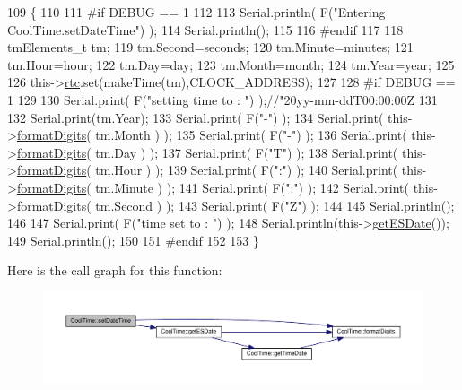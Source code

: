 \begin{DoxyCode}
109 \{ 
110 
111 \textcolor{preprocessor}{#if DEBUG == 1}
112 
113     Serial.println( F(\textcolor{stringliteral}{"Entering CoolTime.setDateTime"}) );
114     Serial.println();
115 
116 \textcolor{preprocessor}{#endif}
117 
118     tmElements\_t tm;
119     tm.Second=seconds; 
120     tm.Minute=minutes; 
121     tm.Hour=hour; 
122     tm.Day=day;
123     tm.Month=month; 
124     tm.Year=year;
125     
126     this->\hyperlink{class_cool_time_abd38f2384ff90692b1568d9db869412e}{rtc}.set(makeTime(tm),CLOCK\_ADDRESS);   
127 
128 \textcolor{preprocessor}{#if DEBUG == 1}
129 
130     Serial.print( F(\textcolor{stringliteral}{"setting time to : "}) );\textcolor{comment}{//"20yy-mm-ddT00:00:00Z}
131 
132     Serial.print(tm.Year);
133     Serial.print( F(\textcolor{stringliteral}{"-"}) );
134     Serial.print( this->\hyperlink{class_cool_time_acd537cd4210d7bde4e1f5c47d2ac0456}{formatDigits}( tm.Month ) );
135     Serial.print( F(\textcolor{stringliteral}{"-"}) );
136     Serial.print( this->\hyperlink{class_cool_time_acd537cd4210d7bde4e1f5c47d2ac0456}{formatDigits}( tm.Day ) );
137     Serial.print( F(\textcolor{stringliteral}{"T"}) );
138     Serial.print( this->\hyperlink{class_cool_time_acd537cd4210d7bde4e1f5c47d2ac0456}{formatDigits}( tm.Hour ) );
139     Serial.print( F(\textcolor{stringliteral}{":"}) );
140     Serial.print( this->\hyperlink{class_cool_time_acd537cd4210d7bde4e1f5c47d2ac0456}{formatDigits}( tm.Minute ) );
141     Serial.print( F(\textcolor{stringliteral}{":"}) );
142     Serial.print( this->\hyperlink{class_cool_time_acd537cd4210d7bde4e1f5c47d2ac0456}{formatDigits}( tm.Second ) );
143     Serial.print( F(\textcolor{stringliteral}{"Z"}) );
144 
145     Serial.println();
146     
147     Serial.print( F(\textcolor{stringliteral}{"time set to : "}) );
148     Serial.println(this->\hyperlink{class_cool_time_ac4f32ee513c1328d984306645e8785a4}{getESDate}());
149     Serial.println();
150 
151 \textcolor{preprocessor}{#endif}
152 
153 \}
\end{DoxyCode}
Here is the call graph for this function\+:\nopagebreak
\begin{figure}[H]
\begin{center}
\leavevmode
\includegraphics[width=350pt]{d6/d49/class_cool_time_ab81ea7fdaace111aa01cc1ec84c6d297_cgraph}
\end{center}
\end{figure}
\mbox{\label{class_cool_time_aae601f795452cfa48d9fb337aed483a8}} 
